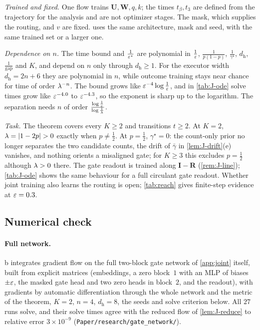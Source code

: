 \begin{remark}[Scope]
\label{rem:joint-scope}
\emph{Trained and fixed.} One flow trains $\mathbf U,\mathbf W,q,k$; the times $t_\beta,t_3$ are defined from the trajectory for the analysis and are not
optimizer stages. The mask, which supplies the routing, and $v$ are fixed.  uses the same architecture, mask and
seed, with the same trained set or a larger one.

\emph{Dependence on $n$.} The time bound and $\frac{1}{\varepsilon^\star}$ are polynomial in $\frac{1}{\varepsilon}$, $\frac{1}{p(1-p)}$, $\frac{1}{\gamma^\star}$, $d_{\mathrm h}$, $\frac{1}{\mathrm{gap}}$ and $K$, and depend on
$n$ only through $d_{\mathrm h}\ge1$. For the executor width $d_{\mathrm h}=2n+6$ they are polynomial in $n$, while outcome training stays near chance for time of order $\lambda^{-n}$. The bound grows like $\varepsilon^{-4}\log\frac{1}{\varepsilon}$, and in \cref{tab:J-ode} solve times grow like $\varepsilon^{-4.0}$ to $\varepsilon^{-4.3}$, so the exponent is
sharp up to the logarithm. The separation needs $n$ of order $\frac{\log\frac{1}{\varepsilon}}{\log\frac{1}{\lambda}}$.

\emph{Task.} The theorem covers every $K\ge2$ and transitions $t\ge2$. At $K=2$, $\mixrate=|1-2p|>0$ exactly when $p\neq\frac{1}{2}$. At $p=\frac{1}{2}$,
$\gamma^\star=0$: the count-only prior no longer separates the two candidate counts, the drift of $\bar\gamma$ in \cref{lem:J-drift}(e) vanishes, and
nothing orients a misaligned gate; for $K\ge3$ this excludes $p=\frac{1}{2}$ although $\lambda>0$ there. The gate readout is trained along
$\mathbf I-\mathbf R$ (\cref{rem:J-line}); \cref{tab:J-ode} shows the same behaviour for a full circulant gate readout. Whether joint training also learns the routing is open;
\cref{tab:reach} gives finite-step evidence at $\varepsilon=0.3$.
\end{remark}

\subsection{Numerical check}
\label{app:J-check}
\paragraph{Full network.} b integrates gradient flow on the full two-block gate network of \cref{app:joint} itself, built
from explicit matrices (embeddings, a zero block~$1$ with an MLP of biases $\pm\varepsilon$, the masked gate head and two zero heads in
block~$2$, and the readout), with gradients by automatic differentiation through the whole network and the metric of the theorem, $K=2$,
$n=4$, $d_{\mathrm h}=8$, the seeds and solve criterion below. All $27$ runs solve, and their solve times agree with the reduced flow of
\cref{lem:J-reduce} to relative error $3\times10^{-9}$ (\texttt{Paper/research/gate\_network/}).

